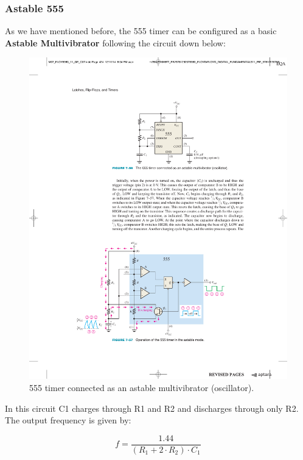 \documentclass[a4paper, 11pt, oneside]{article}
\begin{document}
\subsubsection{Astable 555}

As we have mentioned before, the 555 timer can be configured as a basic \textbf{Astable Multivibrator} following the circuit down below:

\begin{figure}[H]
    \centering
    \includegraphics[scale = 1]{Graphics/Practice 2/GRAPHICS/555/GRAPHS/MODES/ASTABLE.pdf}
    \caption{555 timer connected as an astable multivibrator (oscillator). ~\autocite{FLOYD}}
    \label{fig:ASTABLE}
\end{figure}

In this circuit C1 charges through R1 and R2 and discharges through only R2. The output frequency is given by:

\begin{equation*}
    f = \frac{1.44}{(R_1 + 2\cdot R_2) \cdot C_1}
\end{equation*}
\end{document}
